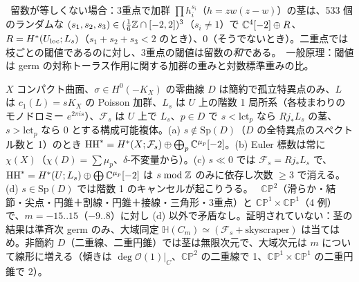 \tV\ 留数が等しくない場合：3重点で加群 $\prod h_i^{s_i}$（$h=zw(z-w)$）の茎は、533 個のランダムな $(s_1,s_2,s_3)\in(\frac16\mathbb Z\cap[-2,2])^3$（$s_i\ne1$）で $\mathbb C^4[-2]\oplus R$、$R=H^*(U_{\rm loc};L_s)$（$s_1+s_2+s_3<2$ のとき）、$0$（そうでないとき）。二重点では枝ごとの閾値であるのに対し、3重点の閾値は留数の\emph{和}である。\tK\ 一般原理：閾値は germ の対称トーラス作用に関する加群の重みと対数標準重みの比。

\begin{conj}\tK
$X$ コンパクト曲面、$\sigma\in H^0(-K_X)$ の零曲線 $D$ は簡約で孤立特異点のみ、$L$ は $c_1(L)=sK_X$ の Poisson 加群、$L_s$ は $U$ 上の階数 1 局所系（各枝まわりのモノドロミー $e^{2\pi is}$）、$\mathcal F_s$ は $U$ 上で $L_s$、$p\in D$ で $s<\mathrm{lct}_p$ なら $Rj_*L_s$ の茎、$s>\mathrm{lct}_p$ なら 0 とする構成可能複体。(a) $s\notin\mathrm{Sp}(D)$（$D$ の全特異点のスペクトル数と 1）のとき $\mathrm{HH}^*=H^*(X;\mathcal F_s)\oplus\bigoplus_p\mathbb C^{\mu_p}[-2]$。(b) Euler 標数は常に $\chi(X)$（$\chi(D)=\sum\mu_p$、$\delta$-不変量から\tP）。(c) $s\ll0$ では $\mathcal F_s=Rj_*L_s$ で、$\mathrm{HH}^*=H^*(U;L_s)\oplus\bigoplus\mathbb C^{\mu_p}[-2]$ は $s\bmod\mathbb Z$ のみに依存し次数 $\ge3$ で消える。(d) $s\in\mathrm{Sp}(D)$ では階数 1 のキャンセルが起こりうる。
\tV\ $\mathbb{CP}^2$（滑らか・結節・尖点・円錐＋割線・円錐＋接線・三角形・3重点）と $\mathbb{CP}^1\times\mathbb{CP}^1$（4 例）で、$m=-15..15$（$-9..8$）に対し (d) 以外で矛盾なし。証明されていない：茎の結果は準斉次 germ のみ、大域同定 $\mathbb H(C_m)\simeq(\mathcal F_s+\text{skyscraper})$ は当てはめ。非簡約 $D$（二重線、二重円錐）では茎は無限次元で、大域次元は $m$ について線形に増える（傾きは $\deg\mathcal O(1)|_C$、$\mathbb{CP}^2$ の二重線で 1、$\mathbb{CP}^1\times\mathbb{CP}^1$ の二重円錐で 2）。
\end{conj}
